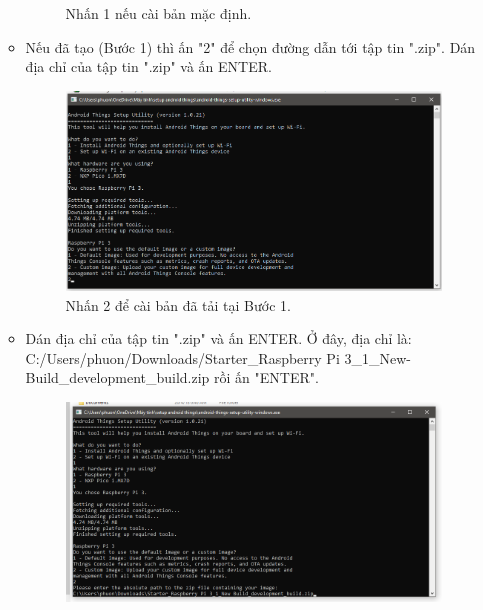 \begin{enumerate}
\begin{itemize}
\begin{center}
\begin{figure}[htp]
\begin{center}
\end{center}
\caption{Nhấn 1 nếu cài bản mặc định.}
\label{refhinh1}
\end{figure}
\end{center}
\item Nếu đã tạo (Bước 1) thì ấn "2" để chọn đường dẫn tới tập tin ".zip". Dán địa chỉ của tập tin ".zip" và ấn ENTER.
\begin{center}
\begin{figure}[htp]
\begin{center}
\includegraphics[scale=0.5]{image3/buoc2cach2s8b.png}
\end{center}
\caption{Nhấn 2 để cài bản đã tải tại Bước 1.}
\label{refhinh1}
\end{figure}
\end{center}
\item Dán địa chỉ của tập tin ".zip" và ấn ENTER. Ở đây, địa chỉ là: \textsf{C:/Users/phuon/Downloads/Starter\_Raspberry Pi 3\_1\_New-
Build\_development\_build.zip} rồi ấn "ENTER".
\begin{center}
\begin{figure}[htp]
\begin{center}
\includegraphics[scale=0.5]{image3/buoc2cach2s8c.png}

\end{center}
\end{figure}
\end{center}
\end{itemize}
\end{enumerate}
